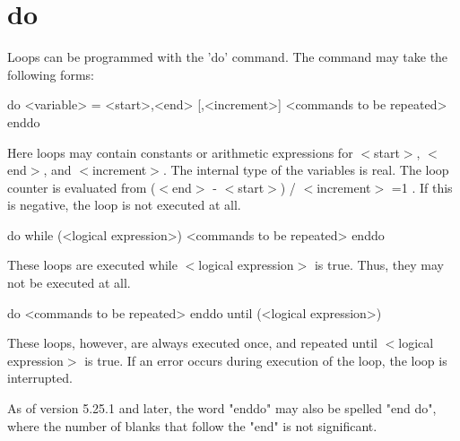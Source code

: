 \section{do}
Loops can be programmed with the 'do' command. The command may take 
the  following forms: 
\begin{MacVerbatim}
do <variable> = <start>,<end> [,<increment>]
  <commands to be repeated>
enddo
\end{MacVerbatim}
Here loops may contain constants or arithmetic expressions 
for $ <$start$> $, $ <$end$> $, and $ <$increment$> $. The internal type of the 
variables is real. The loop counter is evaluated from 
($ <$end$> $ - $ <$start$> $) / $ <$increment$> $ =1 . If this is negative, the loop 
is not executed at all. 
\par
\begin{MacVerbatim}
do while (<logical expression>)
  <commands to be repeated>
enddo
\end{MacVerbatim}
These loops are executed while $ <$logical expression$> $ is true. 
Thus, they may not be executed at all. 
\begin{MacVerbatim}
do
  <commands to be repeated>
enddo until (<logical expression>)
\end{MacVerbatim}
These loops, however, are always executed once, and repeated 
until $ <$logical expression$> $ is true. 
If an error occurs during execution of the loop, the loop is 
interrupted. 
\par
As of version 5.25.1 and later, the word "enddo" 
may also be spelled "end do", where the number of blanks 
that follow the "end" is not significant. 
